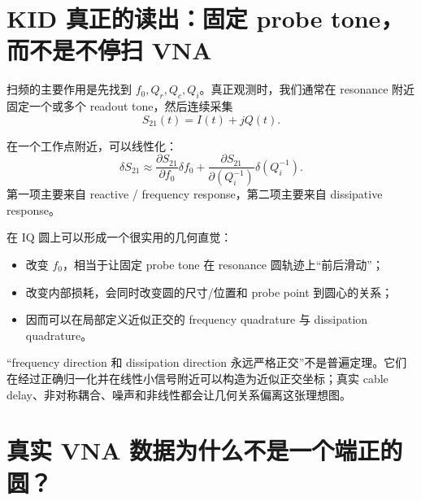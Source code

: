 \documentclass[11pt,a4paper,openany]{ctexrep}
\begin{document}
\section{KID 真正的读出：固定 probe tone，而不是不停扫 VNA}

扫频的主要作用是先找到 $f_0,Q_r,Q_c,Q_i$。真正观测时，我们通常在 resonance 附近固定一个或多个 readout tone，然后连续采集
\[
S_{21}(t)=I(t)+jQ(t).
\]

在一个工作点附近，可以线性化：
\[
\boxed{
\delta S_{21}
\approx
\frac{\partial S_{21}}{\partial f_0}\delta f_0
+
\frac{\partial S_{21}}{\partial(Q_i^{-1})}\delta(Q_i^{-1}).
}
\]
第一项主要来自 reactive / frequency response，第二项主要来自 dissipative response。

在 IQ 圆上可以形成一个很实用的几何直觉：
\begin{itemize}
  \item 改变 $f_0$，相当于让固定 probe tone 在 resonance 圆轨迹上“前后滑动”；
  \item 改变内部损耗，会同时改变圆的尺寸/位置和 probe point 到圆心的关系；
  \item 因而可以在局部定义近似正交的 frequency quadrature 与 dissipation quadrature。
\end{itemize}

\begin{center}
\end{center}

\begin{mistakebox}
“frequency direction 和 dissipation direction 永远严格正交”不是普遍定理。它们在经过正确归一化并在线性小信号附近可以构造为近似正交坐标；真实 cable delay、非对称耦合、噪声和非线性都会让几何关系偏离这张理想图。
\end{mistakebox}

\section{真实 VNA 数据为什么不是一个端正的圆？}
\end{document}
